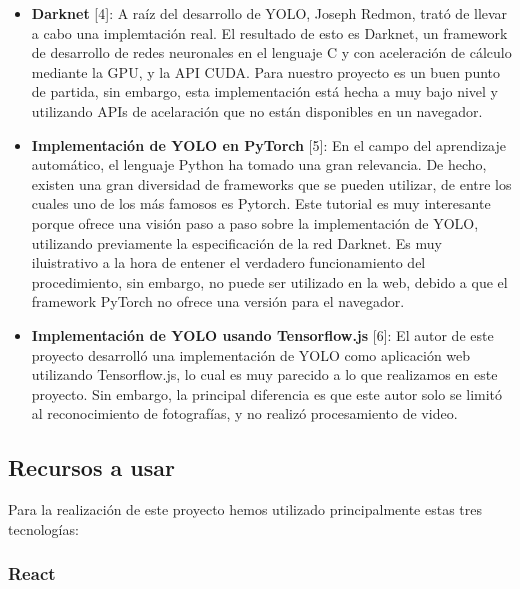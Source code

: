\documentclass[a4paper]{article}
\begin{document}
\begin{itemize}
    \item \textbf{Darknet} [4]: A raíz del desarrollo de YOLO, Joseph Redmon, trató de llevar a cabo 
    una implemtación real. El resultado de esto es Darknet, un framework de desarrollo de redes 
    neuronales en el lenguaje C y con aceleración de cálculo mediante la GPU, y la API CUDA. Para 
    nuestro proyecto es un buen punto de partida, sin embargo, esta implementación está hecha a muy 
    bajo nivel y utilizando APIs de acelaración que no están disponibles en un navegador.
    \item \textbf{Implementación de YOLO en PyTorch} [5]: En el campo del aprendizaje automático, el 
    lenguaje Python ha tomado una gran relevancia. De hecho, existen una gran diversidad de frameworks
    que se pueden utilizar, de entre los cuales uno de los más famosos es Pytorch. Este tutorial es
    muy interesante porque ofrece una visión paso a paso sobre la implementación de YOLO, utilizando 
    previamente la especificación de la red Darknet. Es muy iluistrativo a la hora de entener el 
    verdadero funcionamiento del procedimiento, sin embargo, no puede ser utilizado en la web, debido 
    a que el framework PyTorch no ofrece una versión para el navegador.
    \item \textbf{Implementación de YOLO usando Tensorflow.js} [6]: El autor de este proyecto 
    desarrolló una implementación de YOLO como aplicación web utilizando Tensorflow.js, lo cual es muy
    parecido a lo que realizamos en este proyecto. Sin embargo, la principal diferencia es que este 
    autor solo se limitó al reconocimiento de fotografías, y no realizó procesamiento de video.
\end{itemize}

\subsection{Recursos a usar}
Para la realización de este proyecto hemos utilizado principalmente estas tres tecnologías:

\subsubsection{React}
\end{document}
